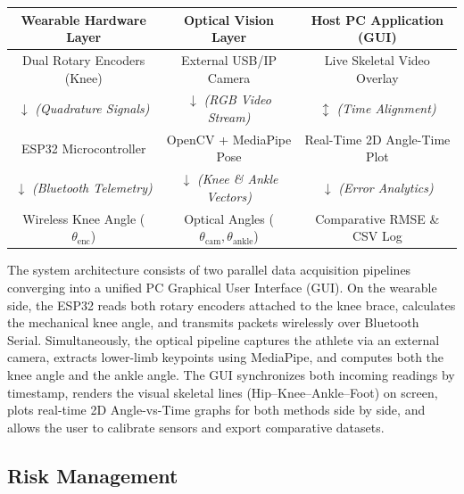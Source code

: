 \documentclass[11pt, a4paper]{article}
\begin{document}
\begin{center}
\setlength{\tabcolsep}{8pt}
\renewcommand{\arraystretch}{1.5}
\begin{tabular}{|c|c|c|}
\hline
\rowcolor{lightgray} \textbf{Wearable Hardware Layer} & \textbf{Optical Vision Layer} & \textbf{Host PC Application (GUI)} \\
\hline
Dual Rotary Encoders (Knee) & External USB/IP Camera & Live Skeletal Video Overlay \\
$\downarrow$ \textit{(Quadrature Signals)} & $\downarrow$ \textit{(RGB Video Stream)} & $\updownarrow$ \textit{(Time Alignment)} \\
ESP32 Microcontroller & OpenCV + MediaPipe Pose & Real-Time 2D Angle-Time Plot \\
$\downarrow$ \textit{(Bluetooth Telemetry)} & $\downarrow$ \textit{(Knee \& Ankle Vectors)} & $\downarrow$ \textit{(Error Analytics)} \\
Wireless Knee Angle ($\theta_{\text{enc}}$) & Optical Angles ($\theta_{\text{cam}}, \theta_{\text{ankle}}$) & Comparative RMSE \& CSV Log \\
\hline
\end{tabular}
\end{center}

The system architecture consists of two parallel data acquisition pipelines converging into a unified PC Graphical User Interface (GUI). On the wearable side, the ESP32 reads both rotary encoders attached to the knee brace, calculates the mechanical knee angle, and transmits packets wirelessly over Bluetooth Serial. Simultaneously, the optical pipeline captures the athlete via an external camera, extracts lower-limb keypoints using MediaPipe, and computes both the knee angle and the ankle angle. The GUI synchronizes both incoming readings by timestamp, renders the visual skeletal lines (Hip--Knee--Ankle--Foot) on screen, plots real-time 2D Angle-vs-Time graphs for both methods side by side, and allows the user to calibrate sensors and export comparative datasets.

\subsection{Risk Management}
\end{document}
